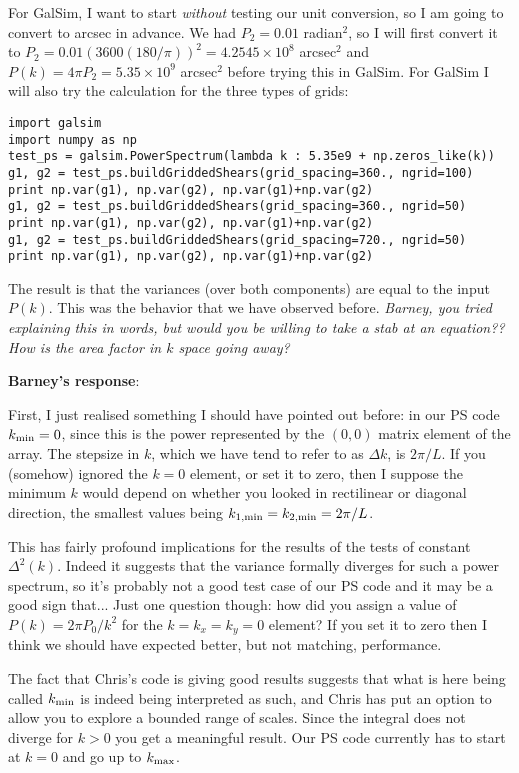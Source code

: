\documentclass[preprint]{aastex}
\begin{document}
For GalSim, I want to start {\em without} testing our unit conversion,
so I am going to convert to arcsec in advance.  We had $P_2=0.01$
radian$^2$, so I will first convert it to
$P_2=0.01 (3600(180/\pi))^2=4.2545\times 10^8$ arcsec$^2$ and
$P(k)=4\pi P_2 = 5.35\times 10^9$ arcsec$^2$ before trying this in
GalSim.  For GalSim I will also try the calculation for the three
types of grids:
\begin{verbatim}
import galsim
import numpy as np
test_ps = galsim.PowerSpectrum(lambda k : 5.35e9 + np.zeros_like(k))
g1, g2 = test_ps.buildGriddedShears(grid_spacing=360., ngrid=100)
print np.var(g1), np.var(g2), np.var(g1)+np.var(g2)
g1, g2 = test_ps.buildGriddedShears(grid_spacing=360., ngrid=50)
print np.var(g1), np.var(g2), np.var(g1)+np.var(g2)
g1, g2 = test_ps.buildGriddedShears(grid_spacing=720., ngrid=50)
print np.var(g1), np.var(g2), np.var(g1)+np.var(g2)
\end{verbatim}
The result is that the variances (over both components) are equal to
the input $P(k)$.  This was the behavior that we have observed before.  {\em Barney, you tried explaining
  this in words, but would you be willing to take a stab at an
  equation??  How is the area factor in $k$ space going away?}

\textbf{Barney's response}:

First, I just realised something I should have pointed out before: in
our PS code $k_{\rm min} = 0$, since this is the power represented by
the $(0, 0)$ matrix element of the array.  The stepsize in $k$, which
we have tend to refer to as $\Delta k$, is $2 \pi / L$.  If you
(somehow) ignored the $k=0$ element, or set it to zero, then I suppose
the minimum $k$ would depend on whether you looked in rectilinear or diagonal direction,
the smallest values being $k_{1, \rm min} = k_{2, \rm min} = 2 \pi / L$.

This has fairly profound implications for the results of the tests of constant
$\Delta^2(k)$.  Indeed it suggests that the variance formally diverges for such
a power spectrum, so it's probably not a good test case of our PS
code and it may be a good sign that...  Just one question though: how did you assign a value of $P(k) = 2 \pi
P_0/ k^2$ for the $k = k_x = k_y = 0$ element?  If you set it to zero
then I think we should have expected better, but not matching, performance.

The fact that Chris's code is giving good results suggests that what
is here being called $k_{\rm min}$ is indeed being interpreted as
such, and Chris has put an option to allow you to explore a bounded
range of scales.  Since the integral does not diverge for $k > 0$ you get a
meaningful result.  Our PS code currently has to start at $k=0$ and go
up to $k_{\rm max}$.
\end{document}
